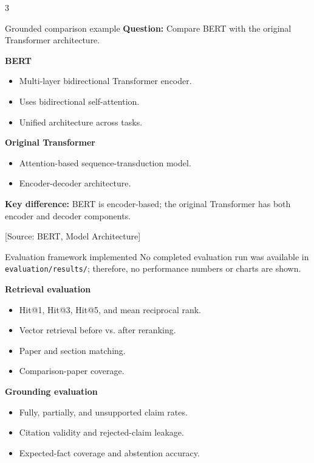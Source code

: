 \documentclass[a0,portrait]{a0poster}
\begin{document}
\begin{multicols}{3}
\begin{posterbox}{Grounded comparison example}
\textbf{Question:} Compare BERT with the original Transformer architecture.

\textbf{BERT}
\begin{itemize}
  \item Multi-layer bidirectional Transformer encoder.
  \item Uses bidirectional self-attention.
  \item Unified architecture across tasks.
\end{itemize}

\textbf{Original Transformer}
\begin{itemize}
  \item Attention-based sequence-transduction model.
  \item Encoder-decoder architecture.
\end{itemize}

\textbf{Key difference:} BERT is encoder-based; the original Transformer has
both encoder and decoder components.

{\small\color{PosterBlue}[Source: BERT, Model Architecture]}
\end{posterbox}

\columnbreak

\begin{posterbox}{Evaluation framework implemented}
No completed evaluation run was available in
\texttt{evaluation/results/}; therefore, no performance numbers or charts are
shown.

\textbf{Retrieval evaluation}
\begin{itemize}
  \item Hit@1, Hit@3, Hit@5, and mean reciprocal rank.
  \item Vector retrieval before vs. after reranking.
  \item Paper and section matching.
  \item Comparison-paper coverage.
\end{itemize}

\textbf{Grounding evaluation}
\begin{itemize}
  \item Fully, partially, and unsupported claim rates.
  \item Citation validity and rejected-claim leakage.
  \item Expected-fact coverage and abstention accuracy.
\end{itemize}


\end{posterbox}
\end{multicols}
\end{document}
